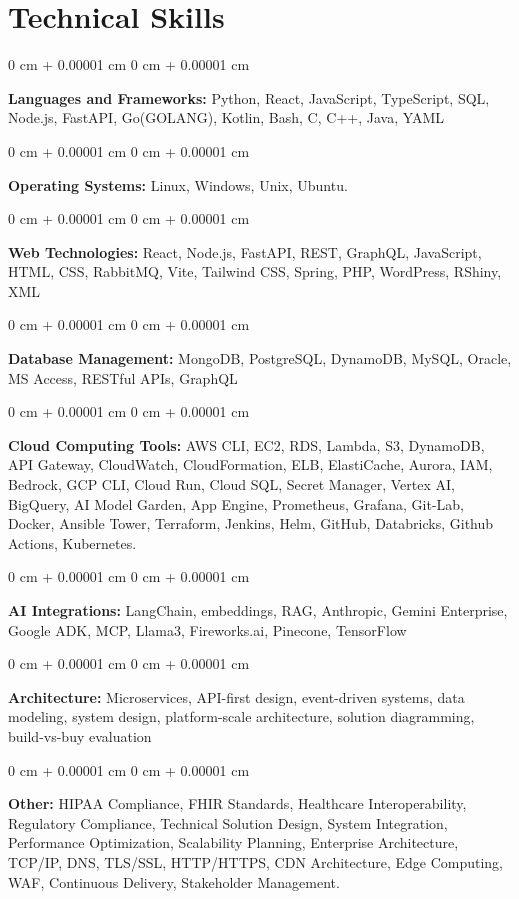 \documentclass[10pt, letterpaper]{article}
\newenvironment{onecolentry}{
    \begin{adjustwidth}{
        0 cm + 0.00001 cm
    }{
        0 cm + 0.00001 cm
    }
}{
    \end{adjustwidth}
} %
\begin{document}
    \section{Technical Skills}
    \vspace{2 pt }
    \begin{onecolentry}
    \textbf{Languages and Frameworks:} Python, React, JavaScript, TypeScript, SQL, Node.js, FastAPI, Go(GOLANG), Kotlin, Bash, C, C++, Java, YAML
    \end{onecolentry}
    \begin{onecolentry}
        \textbf{Operating Systems:} Linux, Windows, Unix, Ubuntu.
    \end{onecolentry}
    \begin{onecolentry}
         \textbf{Web Technologies:} React, Node.js, FastAPI, REST, GraphQL, JavaScript, HTML, CSS, RabbitMQ, Vite, Tailwind CSS, Spring, PHP, WordPress, RShiny, XML
    \end{onecolentry}
    \begin{onecolentry}
        \textbf{Database Management:} MongoDB, PostgreSQL, DynamoDB, MySQL, Oracle, MS Access, RESTful APIs, GraphQL
    \end{onecolentry}
    \begin{onecolentry}
        \textbf{Cloud Computing Tools:}
AWS CLI, EC2, RDS, Lambda, S3, DynamoDB, API Gateway, CloudWatch, CloudFormation, ELB, ElastiCache, Aurora, IAM, Bedrock, GCP CLI, Cloud Run, Cloud SQL, Secret Manager, Vertex AI, BigQuery, AI Model Garden, App Engine, Prometheus, Grafana, Git-Lab, Docker, Ansible Tower, Terraform, Jenkins, Helm, GitHub, Databricks, Github Actions, Kubernetes.
    \end{onecolentry}
    \begin{onecolentry}
         \textbf{AI Integrations:} LangChain, embeddings, RAG, Anthropic, Gemini Enterprise, Google ADK, MCP, Llama3, Fireworks.ai, Pinecone, TensorFlow
    \end{onecolentry}
    \begin{onecolentry}
        \textbf{Architecture:} Microservices, API-first design, event-driven systems, data modeling, system design, platform-scale architecture, solution diagramming, build-vs-buy evaluation
    \end{onecolentry}
        \begin{onecolentry}
     \textbf{Other:} HIPAA Compliance, FHIR Standards, Healthcare Interoperability, Regulatory Compliance, Technical Solution Design, System Integration, Performance Optimization, Scalability Planning, Enterprise Architecture, TCP/IP, DNS, TLS/SSL, HTTP/HTTPS, CDN Architecture, Edge Computing, WAF, Continuous Delivery, Stakeholder Management.
    \end{onecolentry}
\end{document}
